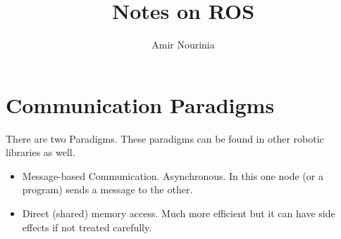 \documentclass[]{report}
\title{Notes on ROS}
\author{Amir Nourinia}
\begin{document}
\maketitle
\section{Communication Paradigms}
    There are two Paradigms. These paradigms can be found in other robotic libraries as well.
    \begin{itemize}
        \item Message-based Communication. Asynchronous. In this one node (or a program) sends a message to the other.
        \item Direct (shared) memory access. Much more efficient but it can have side effects if not treated carefully.
    \end{itemize}
\end{document}
